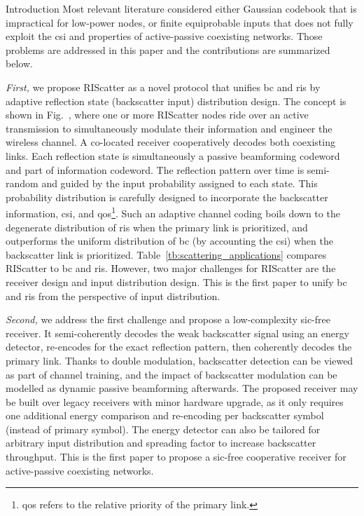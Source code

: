 \begin{section}{Introduction}
	Most relevant literature considered either Gaussian codebook \cite{Guo2019b,Ding2020,Long2020a,Zhou2019a,Wu2021a,Xu2021a,Yang2021a,Hu2021b} that is impractical for low-power nodes, or finite equiprobable inputs \cite{Yang2018,Liang2020,Han2021,Zhang2022,Liu2019d,Bereyhi2020,Xu2020b,Zhang2021d,Hua2022,Basar2020,Ma2020a,Yuan2021,Hu2021a} that does not fully exploit the \gls{csi} and properties of active-passive coexisting networks.
	Those problems are addressed in this paper and the contributions are summarized below.

	\emph{First,} we propose RIScatter as a novel protocol that unifies \gls{bc} and \gls{ris} by adaptive reflection state (backscatter input) distribution design.
	The concept is shown in Fig.~, where one or more RIScatter nodes ride over an active transmission to simultaneously modulate their information and engineer the wireless channel.
	A co-located receiver cooperatively decodes both coexisting links.
	Each reflection state is simultaneously a passive beamforming codeword and part of information codeword.
	The reflection pattern over time is semi-random and guided by the input probability assigned to each state.
	This probability distribution is carefully designed to incorporate the backscatter information, \gls{csi}, and \gls{qos}\footnote{\gls{qos} refers to the relative priority of the primary link.\label{fn:qos}}.
	Such an adaptive channel coding boils down to the degenerate distribution of \gls{ris} when the primary link is prioritized, and outperforms the uniform distribution of \gls{bc} (by accounting the \gls{csi}) when the backscatter link is prioritized.
	Table~\ref{tb:scattering_applications} compares RIScatter to \gls{bc} and \gls{ris}.
	However, two major challenges for RIScatter are the receiver design and input distribution design.
	This is the first paper to unify \gls{bc} and \gls{ris} from the perspective of input distribution.

	\emph{Second,} we address the first challenge and propose a low-complexity \gls{sic}-free receiver.
	It semi-coherently decodes the weak backscatter signal using an energy detector, re-encodes for the exact reflection pattern, then coherently decodes the primary link.
	Thanks to double modulation, backscatter detection can be viewed as part of channel training, and the impact of backscatter modulation can be modelled as dynamic passive beamforming afterwards.
	The proposed receiver may be built over legacy receivers with minor hardware upgrade, as it only requires one additional energy comparison and re-encoding per backscatter symbol (instead of primary symbol).
	The energy detector can also be tailored for arbitrary input distribution and spreading factor to increase backscatter throughput.
	This is the first paper to propose a \gls{sic}-free cooperative receiver for active-passive coexisting networks.


\end{section}
